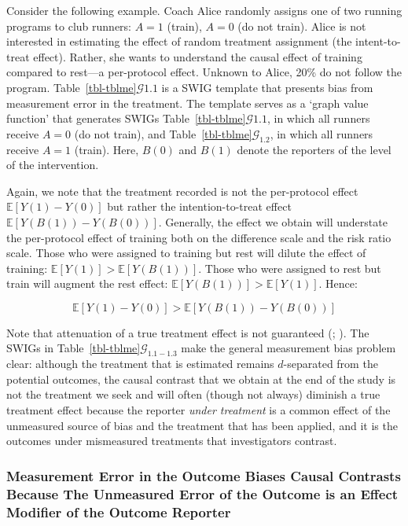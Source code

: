 \documentclass[
  single column]{article}
\begin{document}
Consider the following example. Coach Alice randomly assigns one of two
running programs to club runners: \(A = 1\) (train), \(A = 0\) (do not
train). Alice is not interested in estimating the effect of random
treatment assignment (the intent-to-treat effect). Rather, she wants to
understand the causal effect of training compared to rest---a
per-protocol effect. Unknown to Alice, 20\% do not follow the program.
Table~\ref{tbl-tblme}\(\mathcal{G}{1.1}\) is a SWIG template that
presents bias from measurement error in the treatment. The template
serves as a `graph value function' that generates SWIGs
Table~\ref{tbl-tblme}\(\mathcal{G}{1.1}\), in which all runners receive
\(A = 0\) (do not train), and
Table~\ref{tbl-tblme}\(\mathcal{G}_{1.2}\), in which all runners receive
\(A = 1\) (train). Here, \(B(0)\) and \(B(1)\) denote the reporters of
the level of the intervention.

Again, we note that the treatment recorded is not the per-protocol
effect \(\mathbb{E}[Y(1) - Y(0)]\) but rather the intention-to-treat
effect \(\mathbb{E}[Y(B(1)) - Y(B(0))]\). Generally, the effect we
obtain will understate the per-protocol effect of training both on the
difference scale and the risk ratio scale. Those who were assigned to
training but rest will dilute the effect of training:
\(\mathbb{E}[Y(1)] > \mathbb{E}[Y(B(1))]\). Those who were assigned to
rest but train will augment the rest effect:
\(\mathbb{E}[Y(B(1))] > \mathbb{E}[Y(1)]\). Hence:

\[
 \mathbb{E}[Y(1) - Y(0)] > \mathbb{E}[Y(B(1)) - Y(B(0))]
\]

Note that attenuation of a true treatment effect is not guaranteed
(;
). The SWIGs in
Table~\ref{tbl-tblme}\(\mathcal{G}_{1.1-1.3}\) make the general
measurement bias problem clear: although the treatment that is estimated
remains \(d\)-separated from the potential outcomes, the causal contrast
that we obtain at the end of the study is not the treatment we seek and
will often (though not always) diminish a true treatment effect because
the reporter \emph{under treatment} is a common effect of the unmeasured
source of bias and the treatment that has been applied, and it is the
outcomes under mismeasured treatments that investigators contrast.

\subsubsection{Measurement Error in the Outcome Biases Causal Contrasts
Because The Unmeasured Error of the Outcome is an Effect Modifier of the
Outcome
Reporter}\label{measurement-error-in-the-outcome-biases-causal-contrasts-because-the-unmeasured-error-of-the-outcome-is-an-effect-modifier-of-the-outcome-reporter}
\end{document}
